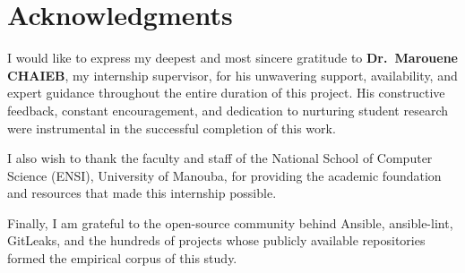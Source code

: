 \chapter*{Acknowledgments}

\vspace{1cm}

\noindent
I would like to express my deepest and most sincere gratitude to
\textbf{Dr.\ Marouene CHAIEB}, my internship supervisor, for his unwavering support,
availability, and expert guidance throughout the entire duration of this project.
His constructive feedback, constant encouragement, and dedication to nurturing
student research were instrumental in the successful completion of this work.

\vspace{0.5cm}

\noindent
I also wish to thank the faculty and staff of the National School of Computer Science
(ENSI), University of Manouba, for providing the academic foundation and resources
that made this internship possible.

\vspace{0.5cm}

\noindent
Finally, I am grateful to the open-source community behind Ansible, ansible-lint,
GitLeaks, and the hundreds of projects whose publicly available repositories formed
the empirical corpus of this study.
